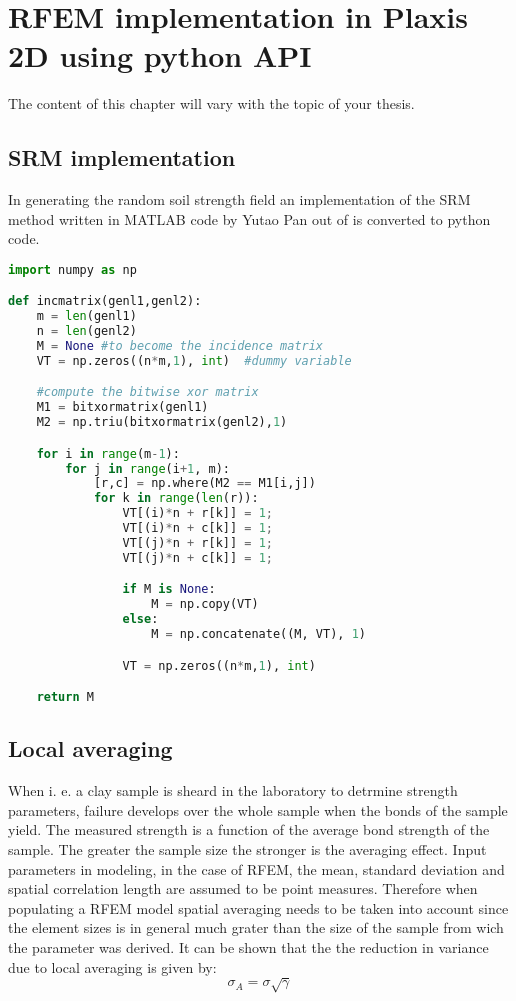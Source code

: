 \chapter[RFEM implementation in Plaxis 2D using python API]{RFEM implementation in Plaxis 2D using python API}
The content of this chapter will vary with the topic of your thesis. 


\section{SRM implementation}

In generating the random soil strength field an implementation of the SRM method written in MATLAB code by Yutao Pan out of \citet*{deodatis1990stochastic} is converted to python code.

\begin{lstlisting}[language=Python, caption=Python example]
import numpy as np

def incmatrix(genl1,genl2):
    m = len(genl1)
    n = len(genl2)
    M = None #to become the incidence matrix
    VT = np.zeros((n*m,1), int)  #dummy variable

    #compute the bitwise xor matrix
    M1 = bitxormatrix(genl1)
    M2 = np.triu(bitxormatrix(genl2),1)

    for i in range(m-1):
        for j in range(i+1, m):
            [r,c] = np.where(M2 == M1[i,j])
            for k in range(len(r)):
                VT[(i)*n + r[k]] = 1;
                VT[(i)*n + c[k]] = 1;
                VT[(j)*n + r[k]] = 1;
                VT[(j)*n + c[k]] = 1;

                if M is None:
                    M = np.copy(VT)
                else:
                    M = np.concatenate((M, VT), 1)

                VT = np.zeros((n*m,1), int)

    return M
\end{lstlisting}

\section{Local averaging}

When i. e. a clay sample is sheard in the laboratory to detrmine strength parameters, failure develops over the whole sample when the bonds of the sample yield. The measured strength is a function of the average bond strength of the sample. The greater the sample size the stronger is the averaging effect.
Input parameters in modeling, in the case of RFEM, the mean, standard deviation and spatial correlation length are assumed to be point measures. 
Therefore when populating a RFEM model spatial averaging needs to be taken into account since the element sizes is in general much grater than the size of the sample from wich the parameter was derived.
It can be shown \citep*{vanmarcke2010random} that the the reduction in variance due to local averaging is given by:
\begin{equation}
\label{eq3.39}
	\sigma_A = \sigma \sqrt{\gamma} 
\end{equation}

